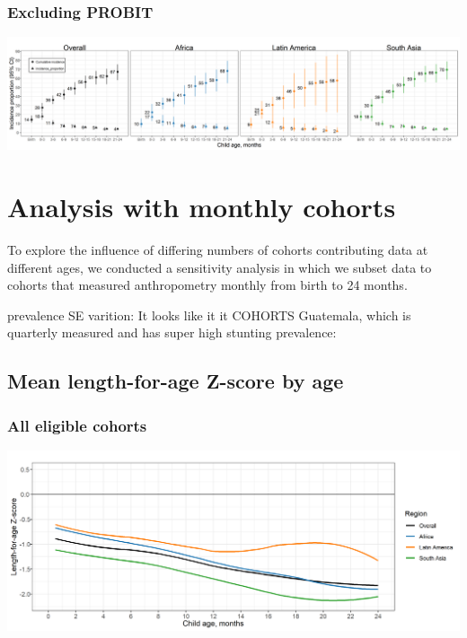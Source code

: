 \documentclass[9pt,]{book}
\begin{document}
\hypertarget{excluding-probit-2}{%
\subsection{Excluding PROBIT}\label{excluding-probit-2}}

\includegraphics[width=66.67in]{figure-copies/fig-stunt-2-inc-overall_region--allage-primary_no_probit}

\hypertarget{monthly}{%
\chapter{Analysis with monthly cohorts}\label{monthly}}

\raggedright

To explore the influence of differing numbers of cohorts contributing data at different ages, we conducted a sensitivity analysis in which we subset data to cohorts that measured anthropometry monthly from birth to 24 months.

prevalence SE varition: It looks like it it COHORTS Guatemala, which is quarterly measured and has super high stunting prevalence:

\hypertarget{mean-length-for-age-z-score-by-age-2}{%
\section{Mean length-for-age Z-score by age}\label{mean-length-for-age-z-score-by-age-2}}

\hypertarget{all-eligible-cohorts}{%
\subsection{All eligible cohorts}\label{all-eligible-cohorts}}

\includegraphics[width=41.67in]{figure-copies/fig-laz-2-mean-overall_region--allage-primary}
\end{document}
